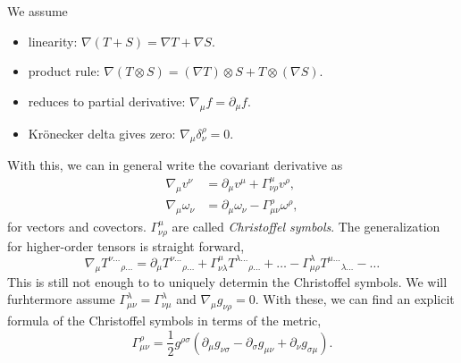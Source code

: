 We assume
%
\begin{itemize}
    \item linearity: $\nabla (T + S) = \nabla T + \nabla S$.
    \item product rule: $\nabla (T \otimes S) = (\nabla T)\otimes S + T \otimes (\nabla S)$.
    \item reduces to partial derivative: $\nabla_\mu f = \partial_\mu f$.
    \item Krönecker delta gives zero: $\nabla_\mu \delta^\rho_\nu = 0$.
\end{itemize}
%
With this, we can in general write the covariant derivative as~\autocite{carrollSpacetimeGeometryIntroduction2019}
%
\begin{align}
    \nabla_\mu v^\nu &= \partial_\mu v^\mu + \Gamma^\mu_{\nu \rho} v^\rho, \\
    \nabla_\mu \omega_\nu &= \partial_\mu \omega_\nu - \Gamma^\rho_{\mu \nu} \omega^\rho,
\end{align}
%
for vectors and covectors.
$\Gamma^{\mu}_{\nu \rho}$ are called \emph{Christoffel symbols}.
The generalization for higher-order tensors is straight forward, 
%
\begin{equation}
    \nabla_\mu T^{\nu\dots}{}_{\rho\dots}
    =
    \partial_\mu T^{\nu\dots}{}_{\rho\dots}
    + \Gamma^\mu_{\nu \lambda} T^{\lambda\dots}{}_{\rho\dots} +\dots
    - \Gamma^\lambda_{\mu \rho} T^{\mu\dots}{}_{\lambda\dots} -\dots
\end{equation}
%
This is still not enough to to uniquely determin the Christoffel symbols.
We will furhtermore assume $\Gamma^{\lambda}_{\mu \nu} = \Gamma^{\lambda}_{\nu \mu}$ and $\nabla_\mu g_{\nu \rho} = 0$.
With these, we can find an explicit formula of the Christoffel symbols in terms of the metric, 
%
\begin{equation}
    \label{christoffel symbols from metric}
    \Gamma^\rho_{\mu \nu} = \frac{1}{2} g^{\rho \sigma} (\partial_\mu g_{\nu \sigma} - \partial_\sigma g_{\mu \nu} + \partial_{\nu}g_{\sigma \mu}).
\end{equation}
%

